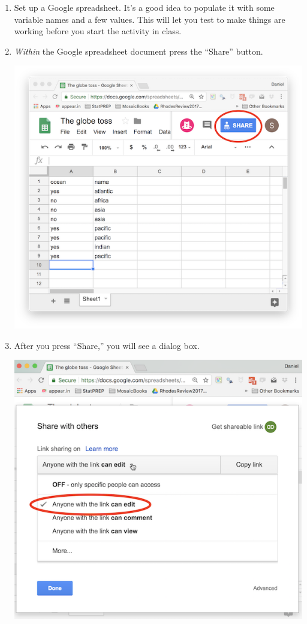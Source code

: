 \documentclass[]{book}
\theoremstyle{definition}
\theoremstyle{definition}
\theoremstyle{definition}
\theoremstyle{remark}
\begin{document}
\begin{enumerate}
\def\labelenumi{\arabic{enumi}.}
\item
  Set up a Google spreadsheet. It's a good idea to populate it with some
  variable names and a few values. This will let you test to make things
  are working before you start the activity in class.
\item
  \emph{Within} the Google spreadsheet document press the ``Share''
  button.

  \includegraphics{images/google1.png}
\item
  After you press ``Share,'' you will see a dialog box.

  \includegraphics{images/google2.png}


\end{enumerate}
\end{document}
